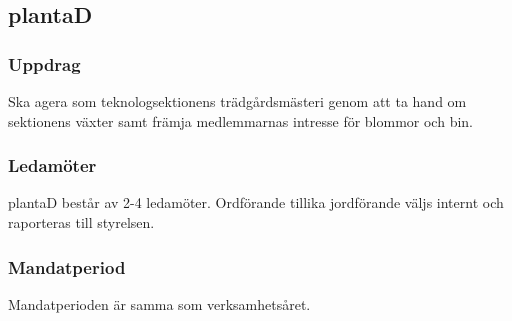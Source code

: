 \subsection{plantaD}
\subsubsection{Uppdrag}
Ska agera som teknologsektionens trädgårdsmästeri genom att ta hand om sektionens växter samt främja medlemmarnas intresse för blommor och bin.
\subsubsection{Ledamöter}
plantaD består av 2-4 ledamöter. Ordförande tillika jordförande väljs internt och raporteras till styrelsen.
\subsubsection{Mandatperiod}
Mandatperioden är samma som verksamhetsåret.
\newpage
